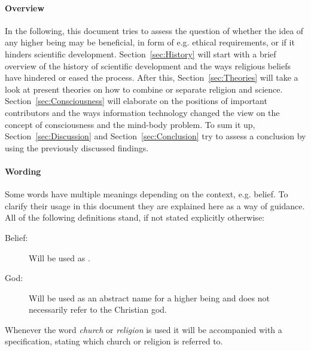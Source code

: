 \paragraph{Overview}
In the following, this document tries to assess the question of whether the idea of any higher being may be beneficial, in form of e.g. ethical requirements, or if it hinders scientific development.
Section~\ref{sec:History} will start with a brief overview of the history of scientific development and the ways religious beliefs have hindered or eased the process.
After this, Section~\ref{sec:Theories} will take a look at present theories on how to combine or separate religion and science.
Section~\ref{sec:Consciousness} will elaborate on the positions of important contributors and the ways information technology changed the view on the concept of consciousness and the mind-body problem.
To sum it up, Section~\ref{sec:Discussion} and Section~\ref{sec:Conclusion} try to assess a conclusion by using the previously discussed findings.

\paragraph{Wording}
Some words have multiple meanings depending on the context, e.g. belief.
To clarify their usage in this document they are explained here as a way of guidance.
All of the following definitions stand, if not stated explicitly otherwise:
\begin{description}
    \item[Belief:] Will be used as .
    \item[God:] Will be used as an abstract name for a higher being and does not necessarily refer to the Christian god.
\end{description}
Whenever the word \emph{church} or \emph{religion} is used it will be accompanied with a specification, stating which church or religion is referred to.